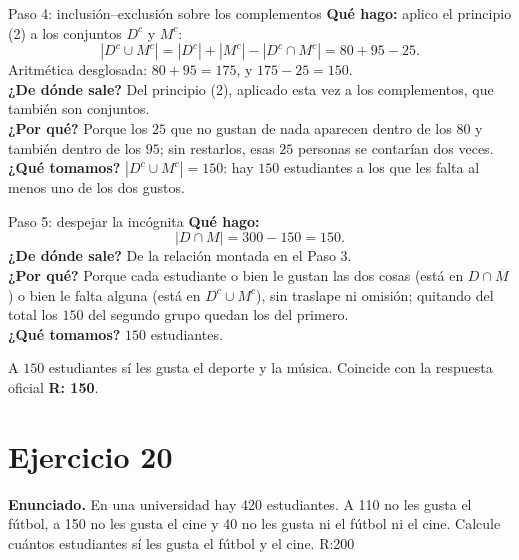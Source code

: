 \documentclass[11pt]{article}
\begin{document}
\begin{sol}
\begin{paso}{Paso 4: inclusi\'on--exclusi\'on sobre los complementos}
\textbf{Qu\'e hago:} aplico el principio (2) a los conjuntos $D^{c}$ y $M^{c}$:
\[
|D^{c}\cup M^{c}| = |D^{c}| + |M^{c}| - |D^{c}\cap M^{c}| = 80 + 95 - 25 .
\]
Aritm\'etica desglosada: $80 + 95 = 175$, y $175 - 25 = 150$.\\
\textbf{¿De d\'onde sale?} Del principio (2), aplicado esta vez a los complementos, que tambi\'en son conjuntos.\\
\textbf{¿Por qu\'e?} Porque los $25$ que no gustan de nada aparecen dentro de los $80$ y tambi\'en dentro de los $95$; sin restarlos, esas $25$ personas se contar\'ian dos veces.\\
\textbf{¿Qu\'e tomamos?} $|D^{c}\cup M^{c}| = 150$: hay $150$ estudiantes a los que les falta al menos uno de los dos gustos.
\end{paso}

\begin{paso}{Paso 5: despejar la inc\'ognita}
\textbf{Qu\'e hago:}
\[
|D\cap M| = 300 - 150 = 150 .
\]
\textbf{¿De d\'onde sale?} De la relaci\'on montada en el Paso 3.\\
\textbf{¿Por qu\'e?} Porque cada estudiante o bien le gustan las dos cosas (est\'a en $D\cap M$) o bien le falta alguna (est\'a en $D^{c}\cup M^{c}$), sin traslape ni omisi\'on; quitando del total los $150$ del segundo grupo quedan los del primero.\\
\textbf{¿Qu\'e tomamos?} $150$ estudiantes.
\end{paso}

\end{sol}

\begin{resp}
A $\boxed{150}$ estudiantes s\'i les gusta el deporte y la m\'usica. Coincide con la respuesta oficial \textbf{R: 150}.
\end{resp}

\newpage

\section*{Ejercicio 20}

\textbf{Enunciado.} En una universidad hay 420 estudiantes. A 110 no les gusta el f\'utbol, a 150 no les gusta el cine y 40 no les gusta ni el f\'utbol ni el cine. Calcule cu\'antos estudiantes s\'i les gusta el f\'utbol y el cine. R:200
\end{document}
